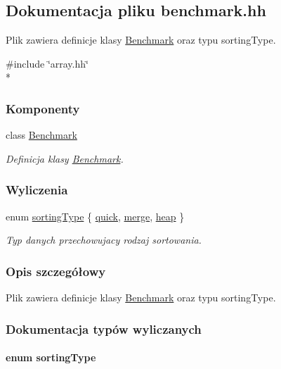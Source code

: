 \hypertarget{benchmark_8hh}{\subsection{Dokumentacja pliku benchmark.\-hh}
\label{benchmark_8hh}
}


Plik zawiera definicje klasy \hyperlink{class_benchmark}{Benchmark} oraz typu sorting\-Type.  


{\ttfamily \#include \char`\"{}array.\-hh\char`\"{}}\\*
\subsubsection*{Komponenty}
\begin{DoxyCompactItemize}
\item 
class \hyperlink{class_benchmark}{Benchmark}
\begin{DoxyCompactList}\small\item\em Definicja klasy \hyperlink{class_benchmark}{Benchmark}. \end{DoxyCompactList}\end{DoxyCompactItemize}
\subsubsection*{Wyliczenia}
\begin{DoxyCompactItemize}
\item 
enum \hyperlink{benchmark_8hh_a08f516d96c62462f77e4e83d222bfdfb}{sorting\-Type} \{ \hyperlink{benchmark_8hh_a08f516d96c62462f77e4e83d222bfdfba6e0cfea25efd107a876dcc7bf7b922c7}{quick}, 
\hyperlink{benchmark_8hh_a08f516d96c62462f77e4e83d222bfdfba47a79557511ab5d9be9b553a1be1872b}{merge}, 
\hyperlink{benchmark_8hh_a08f516d96c62462f77e4e83d222bfdfbad31aa031e5d14d7fbd4997da13384fa2}{heap}
 \}
\begin{DoxyCompactList}\small\item\em Typ danych przechowujacy rodzaj sortowania. \end{DoxyCompactList}\end{DoxyCompactItemize}


\subsubsection{Opis szczegółowy}
Plik zawiera definicje klasy \hyperlink{class_benchmark}{Benchmark} oraz typu sorting\-Type. 

\subsubsection{Dokumentacja typów wyliczanych}
\hypertarget{benchmark_8hh_a08f516d96c62462f77e4e83d222bfdfb}{
\paragraph[{sorting\-Type}]{\setlength{\rightskip}{0pt plus 5cm}enum {\bf sorting\-Type}}}\label{benchmark_8hh_a08f516d96c62462f77e4e83d222bfdfb}


